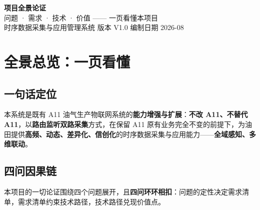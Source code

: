\documentclass[11pt,a4paper]{ctexart}
\begin{document}
\begin{center}
{\Huge\bfseries 项目全景论证}\\[10pt]
{\Large 问题 · 需求 · 技术 · 价值 —— 一页看懂本项目}\\[8pt]
{\large 时序数据采集与应用管理系统 \quad 版本 V1.0 \quad 编制日期 2026-08}
\end{center}

\vspace{1em}
\noindent\hrulefill
\vspace{1em}

\section{全景总览：一页看懂}

\subsection{一句话定位}

本系统是既有 A11 油气生产物联网系统的\textbf{能力增强与扩展}：\textbf{不改 A11、不替代 A11}，以\textbf{路由监听双路采集}方式，在保留 A11 原有业务完全不变的前提下，为油田提供\textbf{高频、动态、差异化、信创化}的时序数据采集与应用能力——\textbf{全域感知、多维联动}。

\subsection{四问因果链}

本项目的一切论证围绕四个问题展开，且\textbf{四问环环相扣}：问题的定性决定需求清单，需求清单约束技术路径，技术路径兑现价值点。
\end{document}
